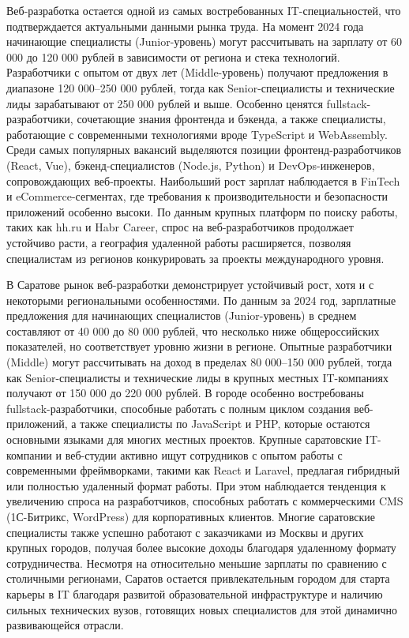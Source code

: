 \documentclass[referat]{SCWorks}
\begin{document}
Веб-разработка остается одной из самых востребованных IT-специальностей, что подтверждается актуальными данными рынка труда.\cite{hh_rus} На момент 2024 года начинающие специалисты (Junior-уровень) могут рассчитывать на зарплату от 60 000 до 120 000 рублей в зависимости от региона и стека технологий. Разработчики с опытом от двух лет (Middle-уровень) получают предложения в диапазоне 120 000–250 000 рублей, тогда как Senior-специалисты и технические лиды зарабатывают от 250 000 рублей и выше. Особенно ценятся fullstack-разработчики, сочетающие знания фронтенда и бэкенда, а также специалисты, работающие с современными технологиями вроде TypeScript и WebAssembly\cite{habr_stats}. Среди самых популярных вакансий выделяются позиции фронтенд-разработчиков (React, Vue), бэкенд-специалистов (Node.js, Python) и DevOps-инженеров, сопровождающих веб-проекты. Наибольший рост зарплат наблюдается в FinTech и eCommerce-сегментах, где требования к производительности и безопасности приложений особенно высоки. По данным крупных платформ по поиску работы, таких как hh.ru и Habr Career, спрос на веб-разработчиков продолжает устойчиво расти, а география удаленной работы расширяется, позволяя специалистам из регионов конкурировать за проекты международного уровня.\cite{rbc_report}

В Саратове рынок веб-разработки демонстрирует устойчивый рост, хотя и с некоторыми региональными особенностями.\cite{hh_saratov} По данным за 2024 год, зарплатные предложения для начинающих специалистов (Junior-уровень) в среднем составляют от 40 000 до 80 000 рублей, что несколько ниже общероссийских показателей, но соответствует уровню жизни в регионе. Опытные разработчики (Middle) могут рассчитывать на доход в пределах 80 000–150 000 рублей, тогда как Senior-специалисты и технические лиды в крупных местных IT-компаниях получают от 150 000 до 220 000 рублей.\cite{saratov_it_news} В городе особенно востребованы fullstack-разработчики, способные работать с полным циклом создания веб-приложений, а также специалисты по JavaScript и PHP, которые остаются основными языками для многих местных проектов. Крупные саратовские IT-компании и веб-студии активно ищут сотрудников с опытом работы с современными фреймворками, такими как React и Laravel, предлагая гибридный или полностью удаленный формат работы. При этом наблюдается тенденция к увеличению спроса на разработчиков, способных работать с коммерческими CMS (1С-Битрикс, WordPress) для корпоративных клиентов. Многие саратовские специалисты также успешно работают с заказчиками из Москвы и других крупных городов, получая более высокие доходы благодаря удаленному формату сотрудничества. Несмотря на относительно меньшие зарплаты по сравнению с столичными регионами, Саратов остается привлекательным городом для старта карьеры в IT благодаря развитой образовательной инфраструктуре и наличию сильных технических вузов, готовящих новых специалистов для этой динамично развивающейся отрасли.\cite{sgu_research}
\end{document}
